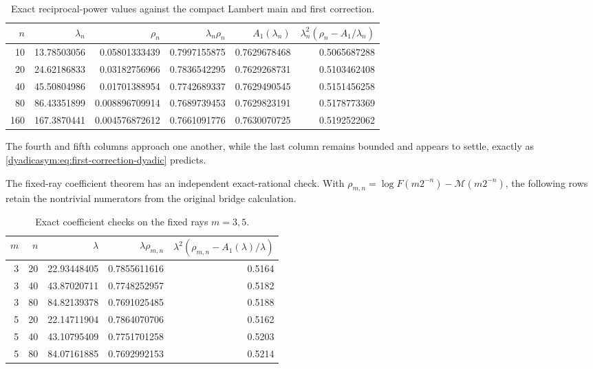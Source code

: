 \documentclass[11pt,oneside]{article}
\theoremstyle{definition}
\theoremstyle{remark}
\begin{document}
\begin{table}[htbp]
\centering
\small
\begin{tabular}{@{}rrrrrr@{}}
\toprule
$n$ & $\lambda_n$ & $\rho_n$ & $\lambda_n\rho_n$
& $A_1(\lambda_n)$ & $\lambda_n^2(\rho_n-A_1/\lambda_n)$\\
\midrule
10  & 13.78503056  & 0.05801333439 & 0.7997155875 & 0.7629678468 & 0.5065687288\\
20  & 24.62186833  & 0.03182756966 & 0.7836542295 & 0.7629268731 & 0.5103462408\\
40  & 45.50804986  & 0.01701388954 & 0.7742689337 & 0.7629490545 & 0.5151456258\\
80  & 86.43351899  & 0.008896709914& 0.7689739453 & 0.7629823191 & 0.5178773369\\
160 & 167.3870441   & 0.004576872612& 0.7661091776 & 0.7630070725 & 0.5192522062\\
\bottomrule
\end{tabular}
\caption{Exact reciprocal-power values against the compact Lambert main and first correction.}
\label{dyadicasym:tab:numerics}
\end{table}

The fourth and fifth columns approach one another, while the last column remains bounded and
appears to settle, exactly as \eqref{dyadicasym:eq:first-correction-dyadic} predicts.

The fixed-ray coefficient theorem has an independent exact-rational check.  With
$\rho_{m,n}=\log F(m2^{-n})-\mathcal M(m2^{-n})$, the following rows retain the
nontrivial numerators from the original bridge calculation.
\begin{table}[htbp]
\centering
\small
\begin{tabular}{@{}rrrrr@{}}
\toprule
$m$ & $n$ & $\lambda$ & $\lambda\rho_{m,n}$ &
$\lambda^2(\rho_{m,n}-A_1(\lambda)/\lambda)$\\
\midrule
3 & 20 & 22.93448405 & 0.7855611616 & 0.5164\\
3 & 40 & 43.87020711 & 0.7748252957 & 0.5182\\
3 & 80 & 84.82139378 & 0.7691025485 & 0.5188\\
5 & 20 & 22.14711904 & 0.7864070706 & 0.5162\\
5 & 40 & 43.10795409 & 0.7751701258 & 0.5203\\
5 & 80 & 84.07161885 & 0.7692992153 & 0.5214\\
\bottomrule
\end{tabular}
\caption{Exact coefficient checks on the fixed rays $m=3,5$.}
\label{dyadicasym:tab:fixed-ray-numerics}
\end{table}
\end{document}
